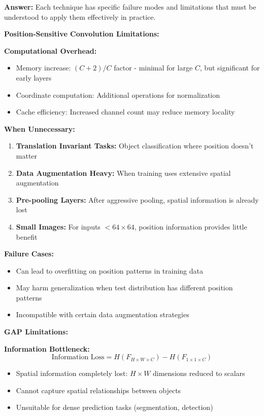 \documentclass[12pt]{article}
\newcommand{\answer}[1]{{\color{answercolor}\textbf{Answer:} #1}}
\newcommand{\explanation}[1]{{\color{explanationcolor}#1}}
\begin{document}
\begin{enumerate}[(a)]
    \answer{Each technique has specific failure modes and limitations that must be understood to apply them effectively in practice.}
    
    \explanation{
    \textbf{Position-Sensitive Convolution Limitations:}
    
    \textbf{Computational Overhead:}
    \begin{itemize}
        \item Memory increase: $(C+2)/C$ factor - minimal for large $C$, but significant for early layers
        \item Coordinate computation: Additional operations for normalization
        \item Cache efficiency: Increased channel count may reduce memory locality
    \end{itemize}
    
    \textbf{When Unnecessary:}
    \begin{enumerate}
        \item \textbf{Translation Invariant Tasks:} Object classification where position doesn't matter
        \item \textbf{Data Augmentation Heavy:} When training uses extensive spatial augmentation
        \item \textbf{Pre-pooling Layers:} After aggressive pooling, spatial information is already lost
        \item \textbf{Small Images:} For inputs $<64 \times 64$, position information provides little benefit
    \end{enumerate}
    
    \textbf{Failure Cases:}
    \begin{itemize}
        \item Can lead to overfitting on position patterns in training data
        \item May harm generalization when test distribution has different position patterns
        \item Incompatible with certain data augmentation strategies
    \end{itemize}
    
    \textbf{GAP Limitations:}
    
    \textbf{Information Bottleneck:}
    $$\text{Information Loss} = H(F_{H \times W \times C}) - H(F_{1 \times 1 \times C})$$
    
    \begin{itemize}
        \item Spatial information completely lost: $H \times W$ dimensions reduced to scalars
        \item Cannot capture spatial relationships between objects
        \item Unsuitable for dense prediction tasks (segmentation, detection)
    \end{itemize}
    
}
\end{enumerate}
\end{document}

